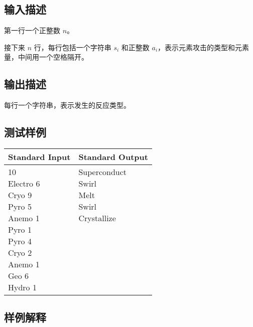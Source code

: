\subsection*{输入描述}

第一行一个正整数 $n$。

接下来 $n$ 行，每行包括一个字符串 $s_i$ 和正整数 $a_i$，表示元素攻击的类型和元素量，中间用一个空格隔开。

\subsection*{输出描述}

每行一个字符串，表示发生的反应类型。

\subsection*{测试样例}

\begin{table}[H]
\begin{tabularx}{\textwidth}{|X|X|}
    \hline
    \textbf{Standard Input} & \textbf{Standard Output} \\ 
    \hline 
    \tablecell{
        10 \\ Electro 6 \\ Cryo 9 \\ Pyro 5 \\ Anemo 1 \\ Pyro 1 \\ Pyro 4 \\ Cryo 2 \\ Anemo 1 \\ Geo 6 \\ Hydro 1 \\
    } & 
    \tablecell{Superconduct \\ Swirl \\ Melt \\ Swirl \\Crystallize \\ \\ \\ \\ \\ \\ \\} \\
    \hline
\end{tabularx}
\end{table}

\subsection*{样例解释}

